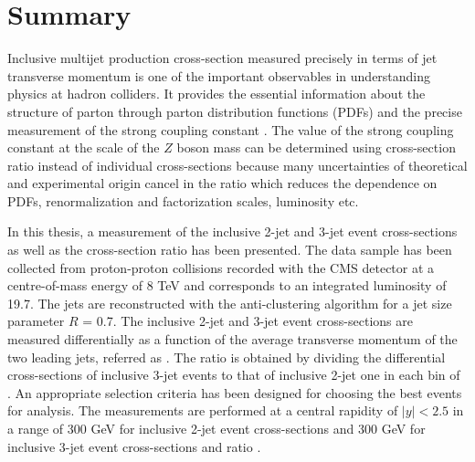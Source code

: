 \chapter{Summary}
\label{chap:Summary}
Inclusive multijet production cross-section measured precisely in terms of jet transverse momentum is one of the important observables in understanding physics at hadron colliders. It provides the essential information about the structure of parton through parton distribution functions (PDFs) and the precise measurement of the strong coupling constant \alps. The value of the strong coupling constant at the scale of the $Z$ boson mass \alpsmz can be determined using cross-section ratio instead of individual cross-sections because many uncertainties of theoretical and experimental origin cancel in the ratio which reduces the dependence on PDFs, renormalization and factorization scales, luminosity etc.

In this thesis, a measurement of the inclusive 2-jet and 3-jet event cross-sections as well as the cross-section ratio \ratio has been presented. The data sample has been collected from proton-proton collisions recorded with the CMS detector at a centre-of-mass energy of 8 TeV and corresponds to an integrated luminosity of 19.7\fbinv. The jets are reconstructed with the anti-\kt clustering algorithm for a jet size parameter $R$ = 0.7. The inclusive 2-jet and 3-jet event cross-sections are measured differentially as a function of the average transverse momentum of the two leading jets, referred as \httwo. The ratio \ratio is obtained by dividing the differential cross-sections of inclusive 3-jet events to that of inclusive 2-jet one in each bin of \httwo. An appropriate selection criteria has been designed for choosing the best events for analysis. The measurements are performed at a central rapidity of $|y|<2.5$ in a range of 300 \ls \httwo {} GeV for inclusive 2-jet event cross-sections and 300 \ls \httwo {} GeV for inclusive 3-jet event cross-sections and ratio \ratio. 

